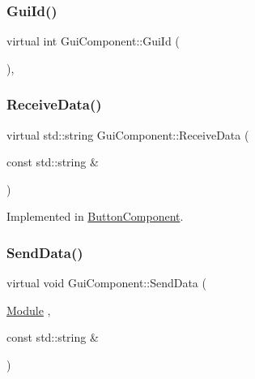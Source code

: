 \mbox{\label{class_gui_component_a57b8809f4ce6a4e238c5b87c158da99b}} 
\subsubsection{\texorpdfstring{GuiId()}{GuiId()}}
{\footnotesize\ttfamily virtual int Gui\+Component\+::\+Gui\+Id (\begin{DoxyParamCaption}{ }\end{DoxyParamCaption})\hspace{0.3cm}{\ttfamily [inline]}, {\ttfamily [virtual]}}

\mbox{\label{class_gui_component_ad136b2da6c63d7d3147f6cc411696cfe}} 
\subsubsection{\texorpdfstring{ReceiveData()}{ReceiveData()}}
{\footnotesize\ttfamily virtual std\+::string Gui\+Component\+::\+Receive\+Data (\begin{DoxyParamCaption}\item[{const std\+::string \&}]{ }\end{DoxyParamCaption})\hspace{0.3cm}{\ttfamily [pure virtual]}}



Implemented in \mbox{\hyperlink{class_button_component_a2f8433707fbd9c184ba359bc41f49305}{Button\+Component}}.

\mbox{\label{class_gui_component_a131dadcfcbe0278cf6c995a64cca871f}} 
\subsubsection{\texorpdfstring{SendData()}{SendData()}\hspace{0.1cm}{\footnotesize\ttfamily [1/2]}}
{\footnotesize\ttfamily virtual void Gui\+Component\+::\+Send\+Data (\begin{DoxyParamCaption}\item[{\mbox{\hyperlink{_mediator_2_mediator_2_commons_8h_a88683b64d84542943724ba0f211153af}{Module}}}]{,  }\item[{const std\+::string \&}]{ }\end{DoxyParamCaption})\hspace{0.3cm}{\ttfamily [pure virtual]}}



